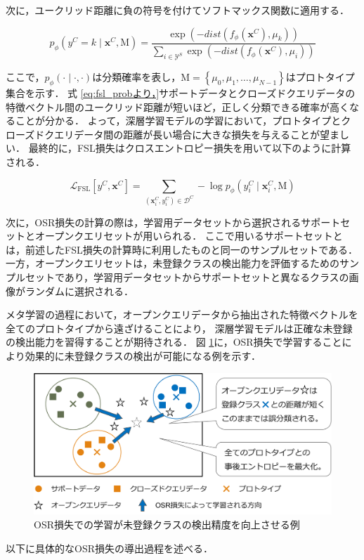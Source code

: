 \documentclass[a4paper,11pt,nomag]{jsreport}
\begin{document}
次に，ユークリッド距離に負の符号を付けてソフトマックス関数に適用する．

\begin{equation}
\label{eq:fsl_prob}
  p_{\phi}(y^C=k \mid \bm{x}^C, \mathrm{M}) 
              = \frac{\exp(-dist(f_\phi(\bm{x}^C),\mu_{k}))}{\sum_{i \in \mathcal{Y}^S} {\exp(-dist(f_\phi(\bm{x}^C),\mu_{i}))}}
\end{equation}

\noindent
ここで，$p_{\phi}(\cdot \mid \cdot, \cdot)$は分類確率を表し，$\mathrm{M} = \left\{\mu_0, \mu_1, \ldots, \mu_{N-1} \right\}$はプロトタイプ集合を示す．
式 \ref{eq:fsl_probより，}サポートデータとクローズドクエリデータの特徴ベクトル間のユークリッド距離が短いほど，正しく分類できる確率が高くなることが分かる．
よって，深層学習モデルの学習において，プロトタイプとクローズドクエリデータ間の距離が長い場合に大きな損失を与えることが望ましい．
最終的に，FSL損失はクロスエントロピー損失を用いて以下のように計算される．

\begin{equation}
  \mathcal{L}_{\mathrm{FSL}} [y^C, \bm{x}^C] = \sum_{(\bm{x}^C_i,y^C_i) \in \mathcal{D}^C} - \log {p_{\phi} (y^C_i \mid \bm{x}^C_i, \mathrm{M})}
\end{equation}

次に，OSR損失の計算の際は，学習用データセットから選択されるサポートセットとオープンクエリセットが用いられる．
ここで用いるサポートセットとは，前述したFSL損失の計算時に利用したものと同一のサンプルセットである．
一方，オープンクエリセットは，未登録クラスの検出能力を評価するためのサンプルセットであり，学習用データセットからサポートセットと異なるクラスの画像がランダムに選択される．

メタ学習の過程において，オープンクエリデータから抽出された特徴ベクトルを全てのプロトタイプから遠ざけることにより，
深層学習モデルは正確な未登録の検出能力を習得することが期待される．
図 \ref{fig:osr_loss}に，OSR損失で学習することにより効果的に未登録クラスの検出が可能になる例を示す．
% 
\begin{figure}[tbp]
  \centering
  \includegraphics[width=\linewidth, keepaspectratio]{image/osr_loss.png}
  \caption{OSR損失での学習が未登録クラスの検出精度を向上させる例}
  \label{fig:osr_loss}
\end{figure}
% 
以下に具体的なOSR損失の導出過程を述べる．
\end{document}
